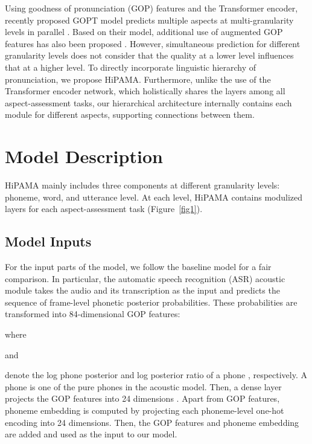 \documentclass{article}
\begin{document}
Using goodness of pronunciation (GOP) \cite{witt2000phone} features and the Transformer \cite{vaswani2017attention} encoder, recently proposed GOPT model predicts multiple aspects at multi-granularity levels in parallel \cite{gong2022transformer}. Based on their model, additional use of augmented GOP features has also been proposed \cite{chao20223m}. However, simultaneous prediction for different granularity levels does not consider that the quality at a lower level influences that at a higher level. To directly incorporate linguistic hierarchy of pronunciation, we propose HiPAMA. Furthermore, unlike the use of the Transformer encoder network, which holistically shares the layers among all aspect-assessment tasks, our hierarchical architecture internally contains each module for different aspects, supporting connections between them.

\section{Model Description}
HiPAMA mainly includes three components at different granularity levels: phoneme, word, and utterance level. At each level, HiPAMA contains modulized layers for each aspect-assessment task (Figure~\ref{fig1}).

\subsection{Model Inputs}
For the input parts of the model, we follow the baseline model \cite{gong2022transformer} for a fair comparison. In particular, the automatic speech recognition (ASR) acoustic module takes the audio and its transcription as the input and predicts the sequence of frame-level phonetic posterior probabilities. These probabilities are transformed into 84-dimensional GOP features:
\begin{small}\end{small}
where \begin{small}\end{small} and \begin{small}\end{small} denote the log phone posterior and log posterior ratio of a phone , respectively. A phone  is one of the pure phones in the acoustic model. Then, a dense layer projects the GOP features into 24 dimensions \cite{gong2022transformer}. Apart from GOP features, phoneme embedding is computed by projecting each phoneme-level one-hot encoding into 24 dimensions. Then, the GOP features and phoneme embedding are added and used as the input to our model.
\end{document}
